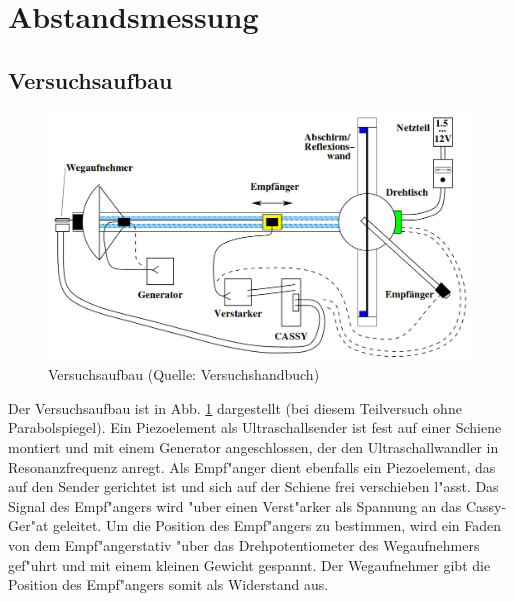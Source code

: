 \documentclass[12pt,a4paper]{article}
\begin{document}
\section{Abstandsmessung}
\subsection{Versuchsaufbau}

\begin{figure}[H]
	\centering
	\includegraphics[scale=0.4]{Bilder/versuchsaufbau.png}
	\caption{Versuchsaufbau (Quelle: Versuchshandbuch)}
	\label{versuchsaufbau}
\end{figure}

Der Versuchsaufbau ist in Abb. \ref{versuchsaufbau} dargestellt (bei diesem Teilversuch ohne Parabolspiegel). Ein Piezoelement als Ultraschallsender ist fest auf einer Schiene montiert und mit einem Generator angeschlossen, der den Ultraschallwandler in Resonanzfrequenz anregt. Als Empf"anger dient ebenfalls ein Piezoelement, das auf den Sender gerichtet ist und sich auf der Schiene frei verschieben l"asst. Das Signal des Empf"angers wird "uber einen Verst"arker als Spannung an das Cassy-Ger"at geleitet. Um die Position des Empf"angers zu bestimmen, wird ein Faden von dem Empf"angerstativ "uber das Drehpotentiometer des Wegaufnehmers gef"uhrt und mit einem kleinen Gewicht gespannt. Der Wegaufnehmer gibt die Position des Empf"angers somit als Widerstand aus.
\end{document}
